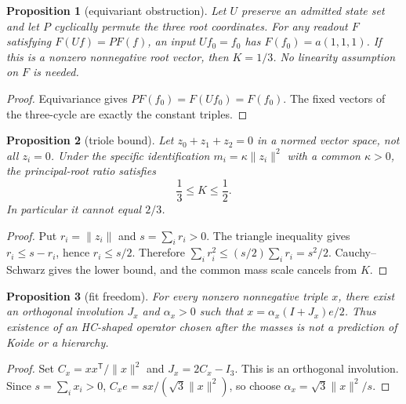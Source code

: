 \documentclass[11pt,a4paper]{article}
\newtheorem{proposition}{Proposition}[section]
\begin{document}
\begin{proposition}[equivariant obstruction]
\label{v480:hc-mass-equivariant-obstruction}
Let $U$ preserve an admitted state set and let $P$ cyclically permute
the three root coordinates. For any readout $F$ satisfying
$F(Uf)=PF(f)$, an input $Uf_0=f_0$ has
$F(f_0)=a(1,1,1)$. If this is a nonzero nonnegative root vector,
then $K=1/3$. No linearity assumption on $F$ is needed.
\end{proposition}
\begin{proof}
Equivariance gives $PF(f_0)=F(Uf_0)=F(f_0)$. The fixed vectors
of the three-cycle are exactly the constant triples.
\end{proof}
\begin{proposition}[triole bound]
\label{v480:hc-mass-triole-bound}
Let $z_0+z_1+z_2=0$ in a normed vector space, not all $z_i=0$.
Under the specific identification $m_i=\kappa\|z_i\|^2$ with a
common $\kappa>0$, the principal-root ratio satisfies
\[
 \frac13\leq K\leq\frac12.
\]
In particular it cannot equal $2/3$.
\end{proposition}
\begin{proof}
Put $r_i=\|z_i\|$ and $s=\sum_i r_i>0$. The triangle inequality
gives $r_i\leq s-r_i$, hence $r_i\leq s/2$. Therefore
$\sum_i r_i^2\leq(s/2)\sum_i r_i=s^2/2$.
Cauchy--Schwarz gives the lower bound, and the common mass scale
cancels from $K$.
\end{proof}
\begin{proposition}[fit freedom]
\label{v480:hc-mass-fit-freedom}
For every nonzero nonnegative triple $x$, there exist an orthogonal
involution $J_x$ and $\alpha_x>0$ such that
$x=\alpha_x(I+J_x)e/2$. Thus existence of an HC-shaped operator
chosen after the masses is not a prediction of Koide or a hierarchy.
\end{proposition}
\begin{proof}
Set $C_x=xx^{\mathsf T}/\|x\|^2$ and $J_x=2C_x-I_3$.
This is an orthogonal involution. Since $s=\sum_i x_i>0$,
$C_xe=sx/(\sqrt3\|x\|^2)$, so choose
$\alpha_x=\sqrt3\|x\|^2/s$.
\end{proof}
\end{document}
